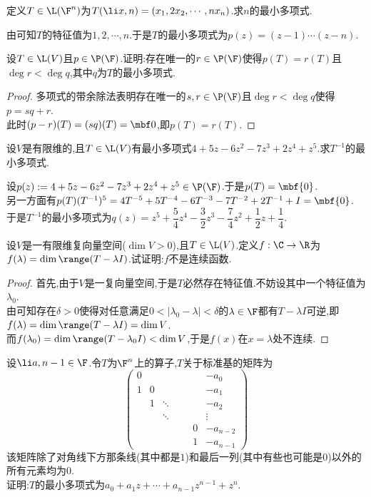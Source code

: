 \documentclass{ctexart}
\begin{document}
\begin{problem}[12.]
    定义$T\in\L(\F^n)$为$T(\li x,n)=(x_1,2x_2,\cdots,nx_n)$.求$n$的最小多项式.
\end{problem}
\begin{solution}
    由可知$T$的特征值为$1,2,\cdots,n$.于是$T$的最小多项式为$p(z)=(z-1)\cdots(z-n)$.
\end{solution}
\begin{problem}[13.]
    设$T\in\L(V)$且$p\in\P(\F)$.证明:存在唯一的$r\in\P(\F)$使得$p(T)=r(T)$且$\deg r<\deg q$,其中$q$为$T$的最小多项式.
\end{problem}
\begin{proof}
    多项式的带余除法表明存在唯一的$s,r\in\P(\F)$且$\deg r<\deg q$使得$p=sq+r$.\\
    此时$(p-r)(T)=(sq)(T)=\mbf0$,即$p(T)=r(T).$
\end{proof}
\begin{problem}[14.]
    设$V$是有限维的,且$T\in\L(V)$有最小多项式$4+5z-6z^2-7z^3+2z^4+z^5$.求$T^{-1}$的最小多项式.
\end{problem}
\begin{solution}
    设$p(z):=4+5z-6z^2-7z^3+2z^4+z^5\in\P(\F)$.于是$p(T)=\mbf{0}$.\\
    另一方面有$p(T)(T^{-1})^5=4T^{-5}+5T^{-4}-6T^{-3}-7T^{-2}+2T^{-1}+I=\mbf{0}$.\\
    于是$T^{-1}$的最小多项式为$q(z)=z^5+\dfrac54z^4-\dfrac32z^3-\dfrac74z^2+\dfrac12z+\dfrac14$.
\end{solution}
\begin{problem}[15.]
    设$V$是一有限维复向量空间($\dim V>0$),且$T\in\L(V)$.定义$f:\C\to\R$为$f(\lambda)=\dim\range(T-\lambda I)$.试证明:$f$不是连续函数.
\end{problem}
\begin{proof}
    首先,由于$V$是一复向量空间,于是$T$必然存在特征值.不妨设其中一个特征值为$\lambda_0$.\\
    由可知存在$\delta>0$使得对任意满足$0<|\lambda_0-\lambda|<\delta$的$\lambda\in\F$都有$T-\lambda I$可逆,即$f(\lambda)=\dim\range(T-\lambda I)=\dim V$.\\
    而$f(\lambda_0)=\dim\range(T-\lambda_0 I)<\dim V$,于是$f(x)$在$x=\lambda$处不连续.
\end{proof}
\begin{problem}[16.]
    设$\li a,{n-1}\in\F$.令$T$为$\F^n$上的算子,$T$关于标准基的矩阵为
    \[\begin{pmatrix}
        0&&&&&&-a_0\\
        1&0&&&&&-a_1\\
        &1&\ddots&&&&-a_2\\
        &&\ddots&&&&\vdots\\
        &&&&&0&-a_{n-2}\\
        &&&&&1&-a_{n-1}
    \end{pmatrix}\]
    该矩阵除了对角线下方那条线(其中都是$1$)和最后一列(其中有些也可能是$0$)以外的所有元素均为$0$.\\
    证明:$T$的最小多项式为$a_0+a_1z+\cdots+a_{n-1}z^{n-1}+z^n$.
\end{problem}
\end{document}

